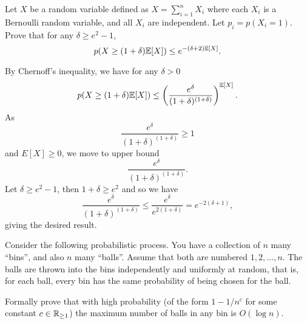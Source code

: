 \question Let $X$ be a random variable defined as $X = \sum_{i=1}^n X_i$ where each $X_i$ is a Bernoulli random variable, and all $X_i$ are independent. Let $p_i = p(X_i = 1)$. Prove that for any $\delta \geq e^2 - 1$,
\[ p(X \geq (1 + \delta)\mathbb E[X]) \leq e^{-(\delta + 2)\mathbb E[X]}. \]

\begin{solution}
    By Chernoff's inequality, we have for any $\delta > 0$
    \[ p(X \geq (1 + \delta)\mathbb E[X]) \leq \left(\frac{e^\delta}{(1+\delta)^{(1+\delta)}}\right)^{\mathbb E[X]}. \]
    As
    \[ \frac{e^\delta}{(1+\delta)^{(1+\delta)}} \geq 1 \]
    and $E[X] \geq 0$, we move to upper bound
    \[ \frac{e^\delta}{(1+\delta)^{(1+\delta)}}. \]
    Let $\delta \geq e^2 - 1$, then $1 + \delta \geq e^2$ and so we have
    \[ \frac{e^\delta}{(1+\delta)^{(1+\delta)}} \leq \frac{e^\delta}{e^{2(1+\delta)}} = e^{-2(\delta + 1)}, \]
    giving the desired result.
\end{solution}

\question Consider the following probabilistic process. You have a collection of $n$ many ``bins'', and also $n$ many ``balls''. Assume that both are numbered $1,2, \ldots, n$. The balls are thrown into the bins independently and uniformly at random, that is, for each ball, every bin has the same probability of being chosen for the ball.

Formally prove that with high probability (of the form $1 - 1/n^c$ for some constant $c \in \mathbb R_{\geq 1}$) the maximum number of balls in any bin is $O(\log n)$.

\begin{solution}
    \todo[inline]{}
\end{solution}